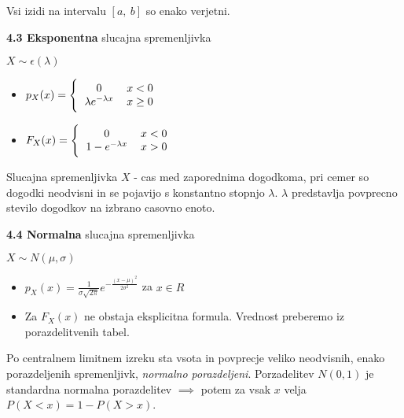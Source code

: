 \documentclass{article}
\begin{document}
\begin{multicols}{3}
Vsi izidi na intervalu $[a,\: b]$ so enako verjetni.

\textbf{4.3 Eksponentna} slucajna spremenljivka
\begin{center}
    \begin{math}
        X \sim \epsilon(\lambda)
    \end{math}
\end{center}

\begin{itemize}
    \item  \begin{math}
        p_{X}(x) =
        \Bigg \{\begin{tabular}{ccc}
          $0$  & $x < 0$ & \\
          $\lambda e^{- \lambda x}$ & $x \geq 0$ & \\
        \end{tabular}
    \end{math} 
    
     \item \begin{math}
        F_{X}(x) =
        \Bigg \{\begin{tabular}{ccc}
          $0$ & $x < 0$ & \\
          $1 - e^{- \lambda x}$ & $x > 0$  & \\
        \end{tabular}
    \end{math}
\end{itemize}

Slucajna spremenljivka $X$ - cas med zaporednima dogodkoma,
pri cemer so dogodki neodvisni in se pojavijo s konstantno
stopnjo $\lambda$. $\lambda$ predstavlja povprecno stevilo dogodkov
na izbrano casovno enoto.

\textbf{4.4 Normalna} slucajna spremenljivka
\begin{center}
    \begin{math}
        X \sim N(\mu, \sigma )
    \end{math}
\end{center}

\begin{itemize}
    \item  \begin{math}
        p_{X}(x) = \frac{1}{\sigma \sqrt{2 \pi}} e^{- \frac{(x - \mu)^{2}}{2 \sigma^{2}}}
    \end{math} za $x \in R$ 
    
     \item Za $F_{X}(x)$ ne obstaja eksplicitna formula. Vrednost preberemo iz porazdelitvenih tabel.
\end{itemize}
Po centralnem limitnem izreku sta vsota in povprecje veliko neodvisnih, enako porazdeljenih
spremenljivk, \textit{normalno porazdeljeni}.
Porzadelitev $N(0, 1)$ je standardna normalna porazdelitev $\implies$ potem za vsak $x$ velja
\begin{math}
    P(X < x) = 1 - P(X > x)
\end{math}.


\end{multicols}
\end{document}
